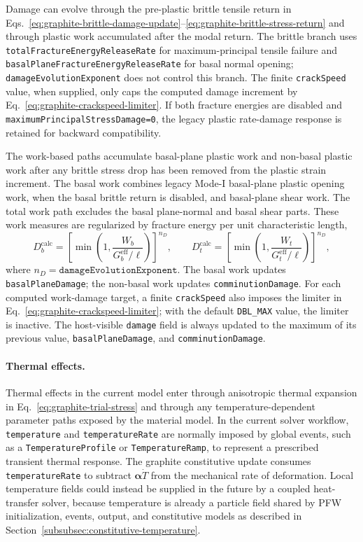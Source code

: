 Damage can evolve through the pre-plastic brittle tensile return in Eqs.~\eqref{eq:graphite-brittle-damage-update}--\eqref{eq:graphite-brittle-stress-return} and through plastic work accumulated after the modal return.  The brittle branch uses \texttt{totalFractureEnergyReleaseRate} for maximum-principal tensile failure and \texttt{basalPlaneFractureEnergyReleaseRate} for basal normal opening; \texttt{damageEvolutionExponent} does not control this branch.  The finite \texttt{crackSpeed} value, when supplied, only caps the computed damage increment by Eq.~\eqref{eq:graphite-crackspeed-limiter}.  If both fracture energies are disabled and \texttt{maximumPrincipalStressDamage=0}, the legacy plastic rate-damage response is retained for backward compatibility.

The work-based paths accumulate basal-plane plastic work and non-basal plastic work after any brittle stress drop has been removed from the plastic strain increment.  The basal work combines legacy Mode-I basal-plane plastic opening work, when the basal brittle return is disabled, and basal-plane shear work.  The total work path excludes the basal plane-normal and basal shear parts.  These work measures are regularized by fracture energy per unit characteristic length,
\begin{equation}
  D_b^{\mathrm{calc}}=
     \left[\min\left(1,\frac{W_b}{G_b^{\mathrm{eff}}/\ell}\right)\right]^{n_D},
  \qquad
  D_t^{\mathrm{calc}}=
     \left[\min\left(1,\frac{W_t}{G_t^{\mathrm{eff}}/\ell}\right)\right]^{n_D},
  \label{eq:graphite-work-damage}
\end{equation}
where \(n_D=\texttt{damageEvolutionExponent}\).  The basal work updates \texttt{basalPlaneDamage}; the non-basal work updates \texttt{comminutionDamage}.  For each computed work-damage target, a finite \texttt{crackSpeed} also imposes the limiter in Eq.~\eqref{eq:graphite-crackspeed-limiter}; with the default \texttt{DBL\_MAX} value, the limiter is inactive.  The host-visible \texttt{damage} field is always updated to the maximum of its previous value, \texttt{basalPlaneDamage}, and \texttt{comminutionDamage}.

\paragraph{Thermal effects.}
Thermal effects in the current model enter through anisotropic thermal expansion in Eq.~\eqref{eq:graphite-trial-stress} and through any temperature-dependent parameter paths exposed by the material model.  In the current solver workflow, \texttt{temperature} and \texttt{temperatureRate} are normally imposed by global events, such as a \texttt{TemperatureProfile} or \texttt{TemperatureRamp}, to represent a prescribed transient thermal response.  The graphite constitutive update consumes \texttt{temperatureRate} to subtract \(\boldsymbol{\alpha}\dot T\) from the mechanical rate of deformation.  Local temperature fields could instead be supplied in the future by a coupled heat-transfer solver, because temperature is already a particle field shared by PFW initialization, events, output, and constitutive models as described in Section~\ref{subsubsec:constitutive-temperature}.


